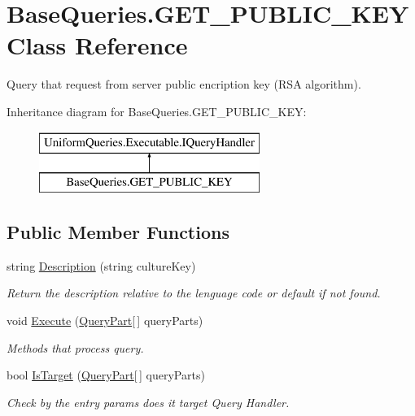 \hypertarget{class_base_queries_1_1_g_e_t___p_u_b_l_i_c___k_e_y}{}\section{Base\+Queries.\+G\+E\+T\+\_\+\+P\+U\+B\+L\+I\+C\+\_\+\+K\+EY Class Reference}
\label{class_base_queries_1_1_g_e_t___p_u_b_l_i_c___k_e_y}


Query that request from server public encription key (R\+SA algorithm).  


Inheritance diagram for Base\+Queries.\+G\+E\+T\+\_\+\+P\+U\+B\+L\+I\+C\+\_\+\+K\+EY\+:\begin{figure}[H]
\begin{center}
\leavevmode
\includegraphics[height=2.000000cm]{da/d28/class_base_queries_1_1_g_e_t___p_u_b_l_i_c___k_e_y}
\end{center}
\end{figure}
\subsection*{Public Member Functions}
\begin{DoxyCompactItemize}
\item 
string \mbox{\hyperlink{class_base_queries_1_1_g_e_t___p_u_b_l_i_c___k_e_y_afcd94e8596f6c015a1a60c987d53cfa8}{Description}} (string culture\+Key)
\begin{DoxyCompactList}\small\item\em Return the description relative to the lenguage code or default if not found. \end{DoxyCompactList}\item 
void \mbox{\hyperlink{class_base_queries_1_1_g_e_t___p_u_b_l_i_c___k_e_y_a6351a2ced538508e861a1829864d1d0d}{Execute}} (\mbox{\hyperlink{struct_uniform_queries_1_1_query_part}{Query\+Part}}\mbox{[}$\,$\mbox{]} query\+Parts)
\begin{DoxyCompactList}\small\item\em Methods that process query. \end{DoxyCompactList}\item 
bool \mbox{\hyperlink{class_base_queries_1_1_g_e_t___p_u_b_l_i_c___k_e_y_a15316117d19cd8d85fb90a37bad5e9d7}{Is\+Target}} (\mbox{\hyperlink{struct_uniform_queries_1_1_query_part}{Query\+Part}}\mbox{[}$\,$\mbox{]} query\+Parts)
\begin{DoxyCompactList}\small\item\em Check by the entry params does it target Query Handler. \end{DoxyCompactList}\end{DoxyCompactItemize}


